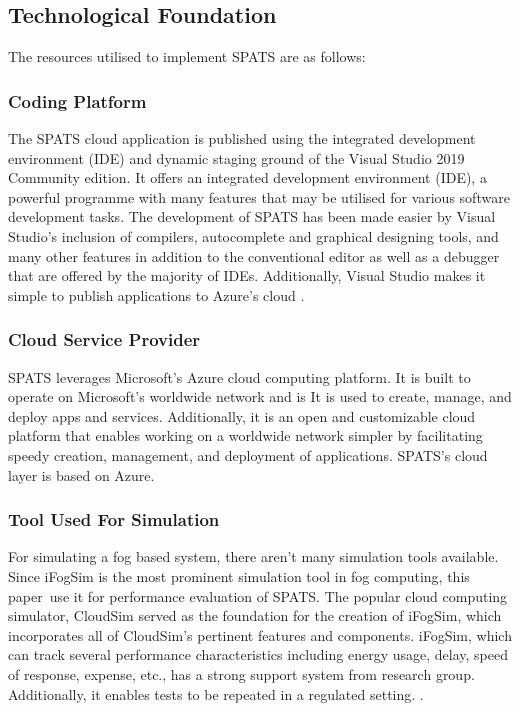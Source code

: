 \documentclass[10pt]{article}
\begin{document}
\subsection{Technological Foundation}
The resources utilised to implement SPATS are as follows:

\subsubsection{Coding Platform}
The SPATS cloud application is published using the integrated development environment (IDE) and dynamic staging ground of the Visual Studio 2019 Community edition. It offers an integrated development environment (IDE), a powerful programme with many features that may be utilised for various software development tasks. The development of SPATS has been made easier by Visual Studio's inclusion of compilers, autocomplete and graphical designing tools, and many other features in addition to the conventional editor as well as a debugger that are offered by the majority of IDEs. Additionally, Visual Studio makes it simple to publish applications to Azure's cloud \cite{25}.

\subsubsection{Cloud Service Provider}
SPATS leverages Microsoft's Azure cloud computing platform.  
It is built to operate on Microsoft's worldwide network and is It is used to create, manage, and deploy apps and services. Additionally, it is an open and customizable cloud platform that enables working on a worldwide network simpler by facilitating speedy creation, management, and deployment of applications. SPATS's cloud layer is based on Azure.

\subsubsection{Tool Used For Simulation}
For simulating a fog based system, there aren't many simulation tools available. Since iFogSim is the most prominent simulation tool in fog computing, this paper use it for performance evaluation of SPATS. The popular cloud computing simulator, CloudSim served as the foundation for the creation of iFogSim, which incorporates all of CloudSim's pertinent features and components. iFogSim, which can track several performance characteristics including energy usage, delay, speed of response, expense, etc., has a strong support system from research group. Additionally, it enables tests to be repeated in a regulated setting. 
\cite{26}.
\end{document}
